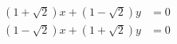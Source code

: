 \begin{align*}
 (1+\sqrt{2})x + (1-\sqrt{2})y &= 0 \\
 (1-\sqrt{2})x + (1+\sqrt{2})y &= 0 
\end{align*}
